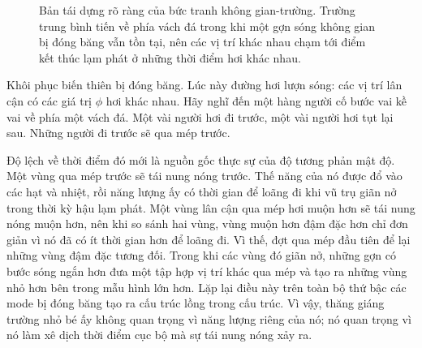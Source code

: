 \begin{figure}[htbp]
\centering
\begin{coursefitfigure}
\end{coursefitfigure}
\caption{Bản tái dựng rõ ràng của bức tranh không gian-trường. Trường trung bình tiến về phía vách đá trong khi một gợn sóng không gian bị đóng băng vẫn tồn tại, nên các vị trí khác nhau chạm tới điểm kết thúc lạm phát ở những thời điểm hơi khác nhau.}
\label{fig:c10-cliff-reconstruction}
\end{figure}

Khôi phục biến thiên bị đóng băng. Lúc này đường hơi lượn sóng: các vị trí lân cận có các giá trị \(\phi\) hơi khác nhau. Hãy nghĩ đến một hàng người cố bước vai kề vai về phía một vách đá. Một vài người hơi đi trước, một vài người hơi tụt lại sau. Những người đi trước sẽ qua mép trước.

Độ lệch về thời điểm đó mới là nguồn gốc thực sự của độ tương phản mật độ. Một vùng qua mép trước sẽ tái nung nóng trước. Thế năng của nó được đổ vào các hạt và nhiệt, rồi năng lượng ấy có thời gian để loãng đi khi vũ trụ giãn nở trong thời kỳ hậu lạm phát. Một vùng lân cận qua mép hơi muộn hơn sẽ tái nung nóng muộn hơn, nên khi so sánh hai vùng, vùng muộn hơn đậm đặc hơn chỉ đơn giản vì nó đã có ít thời gian hơn để loãng đi. Vì thế, đợt qua mép đầu tiên để lại những vùng đậm đặc tương đối. Trong khi các vùng đó giãn nở, những gợn có bước sóng ngắn hơn đưa một tập hợp vị trí khác qua mép và tạo ra những vùng nhỏ hơn bên trong mẫu hình lớn hơn. Lặp lại điều này trên toàn bộ thứ bậc các mode bị đóng băng tạo ra cấu trúc lồng trong cấu trúc. Vì vậy, thăng giáng trường nhỏ bé ấy không quan trọng vì năng lượng riêng của nó; nó quan trọng vì nó làm xê dịch thời điểm cục bộ mà sự tái nung nóng xảy ra.

